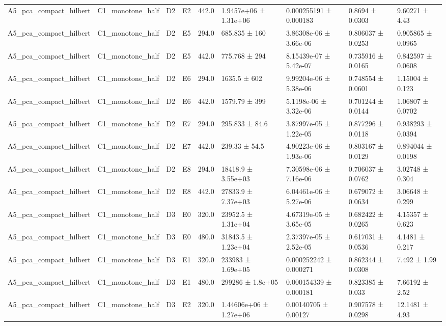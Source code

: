 \begin{table}
\begin{tabular}{lllllllll}
A5\_pca\_compact\_hilbert & C1\_monotone\_half & D2 & E2 & 442.0 & 1.9457e+06 ± 1.31e+06 & 0.000255191 ± 0.000183 & 0.8694 ± 0.0303 & 9.60271 ± 4.43 \\
A5\_pca\_compact\_hilbert & C1\_monotone\_half & D2 & E5 & 294.0 & 685.835 ± 160 & 3.86308e-06 ± 3.66e-06 & 0.806037 ± 0.0253 & 0.905865 ± 0.0965 \\
A5\_pca\_compact\_hilbert & C1\_monotone\_half & D2 & E5 & 442.0 & 775.768 ± 294 & 8.15439e-07 ± 5.42e-07 & 0.735916 ± 0.0165 & 0.842597 ± 0.0608 \\
A5\_pca\_compact\_hilbert & C1\_monotone\_half & D2 & E6 & 294.0 & 1635.5 ± 602 & 9.99204e-06 ± 5.38e-06 & 0.748554 ± 0.0601 & 1.15004 ± 0.123 \\
A5\_pca\_compact\_hilbert & C1\_monotone\_half & D2 & E6 & 442.0 & 1579.79 ± 399 & 5.1198e-06 ± 3.32e-06 & 0.701244 ± 0.0144 & 1.06807 ± 0.0702 \\
A5\_pca\_compact\_hilbert & C1\_monotone\_half & D2 & E7 & 294.0 & 295.833 ± 84.6 & 3.87997e-05 ± 1.22e-05 & 0.877296 ± 0.0118 & 0.938293 ± 0.0394 \\
A5\_pca\_compact\_hilbert & C1\_monotone\_half & D2 & E7 & 442.0 & 239.33 ± 54.5 & 4.90223e-06 ± 1.93e-06 & 0.803167 ± 0.0129 & 0.894044 ± 0.0198 \\
A5\_pca\_compact\_hilbert & C1\_monotone\_half & D2 & E8 & 294.0 & 18418.9 ± 3.55e+03 & 7.30598e-06 ± 7.16e-06 & 0.706037 ± 0.0762 & 3.02748 ± 0.304 \\
A5\_pca\_compact\_hilbert & C1\_monotone\_half & D2 & E8 & 442.0 & 27833.9 ± 7.37e+03 & 6.04461e-06 ± 5.27e-06 & 0.679072 ± 0.0634 & 3.06648 ± 0.299 \\
A5\_pca\_compact\_hilbert & C1\_monotone\_half & D3 & E0 & 320.0 & 23952.5 ± 1.31e+04 & 4.67319e-05 ± 3.65e-05 & 0.682422 ± 0.0265 & 4.15357 ± 0.623 \\
A5\_pca\_compact\_hilbert & C1\_monotone\_half & D3 & E0 & 480.0 & 31843.5 ± 1.23e+04 & 2.37397e-05 ± 2.52e-05 & 0.617031 ± 0.0536 & 4.1481 ± 0.217 \\
A5\_pca\_compact\_hilbert & C1\_monotone\_half & D3 & E1 & 320.0 & 233983 ± 1.69e+05 & 0.000252242 ± 0.000271 & 0.862344 ± 0.0308 & 7.492 ± 1.99 \\
A5\_pca\_compact\_hilbert & C1\_monotone\_half & D3 & E1 & 480.0 & 299286 ± 1.8e+05 & 0.000154339 ± 0.000181 & 0.823385 ± 0.033 & 7.66192 ± 2.52 \\
A5\_pca\_compact\_hilbert & C1\_monotone\_half & D3 & E2 & 320.0 & 1.44606e+06 ± 1.27e+06 & 0.00140705 ± 0.00127 & 0.907578 ± 0.0298 & 12.1481 ± 4.93 \\

\end{tabular}
\end{table}
